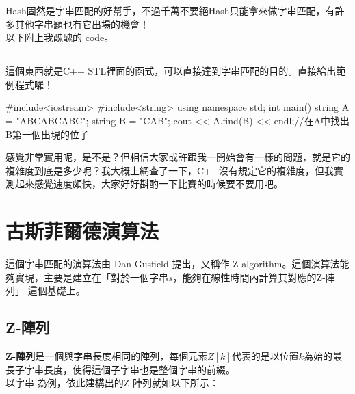 Hash固然是字串匹配的好幫手，不過千萬不要絕Hash只能拿來做字串匹配，有許多其他字串題也有它出場的機會！\\

以下附上我醜醜的 code。

\subsection{}
這個東西就是C++ STL裡面的函式，可以直接達到字串匹配的目的。直接給出範例程式囉！
\begin{C++}
#include<iostream>
#include<string>
using namespace std;
int main()
{
  string A = "ABCABCABC";
  string B = "CAB";
  cout << A.find(B) << endl;//在A中找出B第一個出現的位子
}
\end{C++}
感覺非常實用呢，是不是？但相信大家或許跟我一開始會有一樣的問題，就是它的複雜度到底是多少呢？我大概上網查了一下，C++沒有規定它的複雜度，但我實測起來感覺速度頗快，大家好好斟酌一下比賽的時候要不要用吧。

\section{古斯菲爾德演算法}

這個字串匹配的演算法由 Dan Gusfield 提出，又稱作 Z-algorithm。這個演算法能夠實現，主要是建立在「對於一個字串$s$，能夠在線性時間內計算其對應的Z-陣列」 這個基礎上。\\

\subsection{Z-陣列}

\textbf{Z-陣列}是一個與字串長度相同的陣列，每個元素$Z[k]$代表的是以位置$k$為始的最長子字串長度，使得這個子字串也是整個字串的前綴。\\

以字串 為例，依此建構出的Z-陣列就如以下所示：\\


